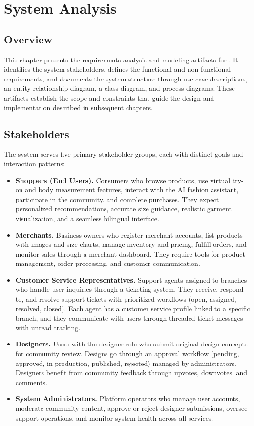 \chapter{System Analysis}

\section{Overview}
This chapter presents the requirements analysis and modeling artifacts for \projectname. It identifies the system stakeholders, defines the functional and non-functional requirements, and documents the system structure through use case descriptions, an entity-relationship diagram, a class diagram, and process diagrams. These artifacts establish the scope and constraints that guide the design and implementation described in subsequent chapters.

\section{Stakeholders}
The system serves five primary stakeholder groups, each with distinct goals and interaction patterns:

\begin{itemize}[leftmargin=*]
    \item \textbf{Shoppers (End Users).} Consumers who browse products, use virtual try-on and body measurement features, interact with the AI fashion assistant, participate in the community, and complete purchases. They expect personalized recommendations, accurate size guidance, realistic garment visualization, and a seamless bilingual interface.

    \item \textbf{Merchants.} Business owners who register merchant accounts, list products with images and size charts, manage inventory and pricing, fulfill orders, and monitor sales through a merchant dashboard. They require tools for product management, order processing, and customer communication.

    \item \textbf{Customer Service Representatives.} Support agents assigned to branches who handle user inquiries through a ticketing system. They receive, respond to, and resolve support tickets with prioritized workflows (open, assigned, resolved, closed). Each agent has a customer service profile linked to a specific branch, and they communicate with users through threaded ticket messages with unread tracking.

    \item \textbf{Designers.} Users with the designer role who submit original design concepts for community review. Designs go through an approval workflow (pending, approved, in production, published, rejected) managed by administrators. Designers benefit from community feedback through upvotes, downvotes, and comments.

    \item \textbf{System Administrators.} Platform operators who manage user accounts, moderate community content, approve or reject designer submissions, oversee support operations, and monitor system health across all services.
\end{itemize}

